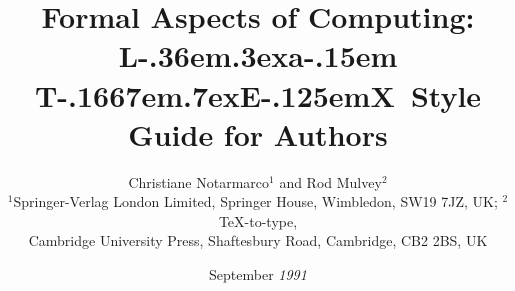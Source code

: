 





\def\eg{{\it e.g.\ }}
\def\etc{{\it etc}}
\def\visiblespace{\leavevmode\hbox{\tt\char`\ }}
\def\LaTeX{L\kern-.36em\raise.3ex\hbox{a}\kern-.15em
    T\kern-.1667em\lower.7ex\hbox{E}\kern-.125emX}

\newtheorem{theorem}{Theorem}[section]

\title[Formal Aspects of Computing: \LaTeX\ Submissions]
      {Formal Aspects of Computing:\\
       \LaTeX\ Style Guide for Authors}

\author[C. Notarmarco and R. Mulvey]
    {Christiane Notarmarco$^1$ and Rod Mulvey$^2$\\
      $^1$Springer-Verlag London Limited, Springer House,
      Wimbledon, SW19 7JZ, UK; $^2$\TeX-to-type,\\
      Cambridge University Press, Shaftesbury Road,
      Cambridge, CB2 2BS, UK}


\date{September\/ \em 1991}
\pagerange{\pageref{firstpage}--\pageref{lastpage}}


\label{firstpage}

\makecorrespond
\maketitle

